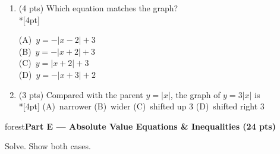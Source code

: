 \documentclass[12pt]{article}
\newcommand{\lgrid}[4]{%
  \draw[step=1, linegray!40, very thin] (#1,#3) grid (#2,#4);
  \draw[->, semithick, charcoal] (#1,0)--(#2,0) node[below right, font=\scriptsize]{$x$};
  \draw[->, semithick, charcoal] (0,#3)--(0,#4) node[left, font=\scriptsize]{$y$};}
\newcommand{\parthead}[1]{%
  \boxguard[10]\vspace{6pt}\noindent
  \begin{headlinebox}{forest}\color{white}\bfseries #1\end{headlinebox}%
  \vspace{4pt}}
\newcommand{\opt}[2]{(#1)~#2}
\newcommand{\optok}[2]{(#1)~#2}
\begin{document}
\begin{enumerate}[leftmargin=1.9em, itemsep=10pt, label=\arabic*., start=15]
  \item {}(4 pts) Which equation matches the graph?
    \\*[4pt]
    \begin{minipage}[c]{0.36\linewidth}\centering
    \end{minipage}%
    \begin{minipage}[c]{0.6\linewidth}
    \opt{A}{$y=-|x-2|+3$} \\[6pt]
    \optok{B}{$y=-|x+2|+3$} \\[6pt]
    \opt{C}{$y=|x+2|+3$} \\[6pt]
    \opt{D}{$y=-|x+3|+2$}
    \end{minipage}

  \item {}(3 pts) Compared with the parent $y=|x|$, the graph of $y=3|x|$ is
    \\*[4pt]
    \optok{A}{narrower} \hfill \opt{B}{wider} \hfill \opt{C}{shifted up 3} \hfill
    \opt{D}{shifted right 3}
\end{enumerate}

\parthead{Part E --- Absolute Value Equations \& Inequalities (24 pts)}
Solve. Show both cases.
\end{document}
